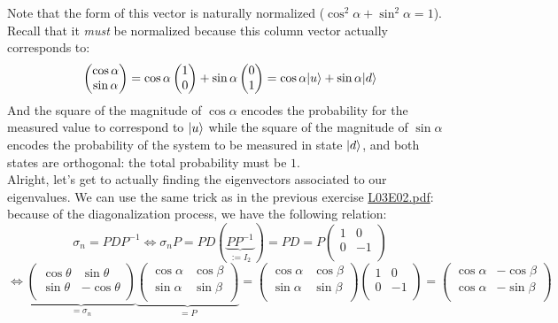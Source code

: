 \documentclass[solutions.tex]{subfiles}
\begin{document}
Note that the form of this vector is naturally normalized ($\cos^2\alpha
+\sin^2\alpha = 1$). Recall that it \textit{must} be normalized because
this column vector actually corresponds to:
\[
	\begin{pmatrix}
		\cos\alpha \\
		\sin\alpha \\
	\end{pmatrix} = \cos\alpha\begin{pmatrix}
		1 \\
		0 \\
	\end{pmatrix} + \sin\alpha\begin{pmatrix}
		0 \\
		1 \\
	\end{pmatrix} = \cos\alpha|u\rangle + \sin\alpha|d\rangle
\]
And the square of the magnitude of $\cos\alpha$ encodes the
probability for the measured value to correspond to $|u\rangle$
while the square of the magnitude of $\sin\alpha$ encodes the
probability of the system to be measured in state $|d\rangle$,
and both states are orthogonal: the total probability must be $1$. \\

Alright, let's get to actually finding the eigenvectors
associated to our eigenvalues. We can use the same trick as
in the previous exercise
\href{https://github.com/mbivert/ttm/blob/master/qm/L03E02.pdf}{L03E02.pdf}:
because of the diagonalization process, we have the following relation:
\[
	\sigma_n = PDP^{-1} \Leftrightarrow \sigma_n P
		= PD(\underbrace{PP^{-1}}_{:=I_2}) = PD = P\begin{pmatrix}
		1 & 0 \\
		0 & -1 \\
	\end{pmatrix}
\]
\[
	\Leftrightarrow \underbrace{\begin{pmatrix}
		\cos\theta & \sin\theta \\
		\sin\theta & -\cos\theta \\
	\end{pmatrix}}_{=\sigma_n}\underbrace{\begin{pmatrix}
		\cos\alpha & \cos\beta \\
		\sin\alpha & \sin\beta \\
	\end{pmatrix}}_{=P} =\begin{pmatrix}
		\cos\alpha & \cos\beta \\
		\sin\alpha & \sin\beta \\
	\end{pmatrix}\begin{pmatrix}
		1 & 0 \\
		0 & -1 \\
	\end{pmatrix} = \begin{pmatrix}
		\cos\alpha & -\cos\beta \\
		\cos\alpha & -\sin\beta \\
	\end{pmatrix}
\]
\end{document}
